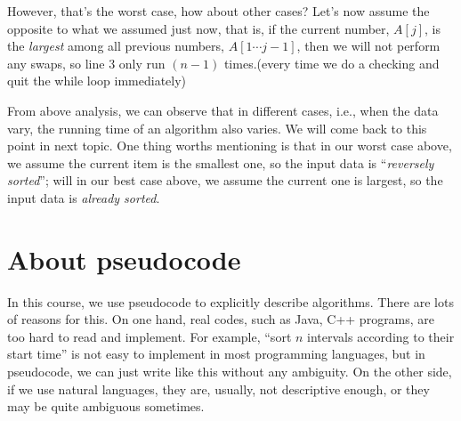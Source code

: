 \begin{spacing}{1.3}
    However, that's the worst case, how about other cases? Let's now assume the opposite 
    to what we assumed just now, that is, if the current number, $A[j]$, 
    is the {\it largest} among all previous numbers, $A[1\cdots j-1]$, then we will not 
    perform any swaps, so line 3 only run $(n-1)$ times.(every time we do a checking 
    and quit the while loop immediately)

    From above analysis, we can observe that in different cases, i.e., when the data vary,
    the running time of an algorithm also varies. We will come back to this point 
    in next topic. One thing worths mentioning is that in our worst case above, 
    we assume the current item is the smallest one, so the input data is 
    ``{\it reversely sorted}''; will in our best case above, we assume the current one is 
    largest, so the input data is {\it already sorted}.
    




    \vspace{0.3in}
    \section{About pseudocode}

    In this course, we use pseudocode to explicitly describe algorithms.
    There are lots of reasons for this. On one hand, real codes, such as 
    Java, C++ programs, are too hard to read and implement. For example,
    ``sort $n$ intervals according to their start time'' is not easy to 
    implement in most programming languages, but in pseudocode, we can 
    just write like this without any ambiguity. On the other side, 
    if we use natural languages, they are, usually, not descriptive enough,
    or they may be quite ambiguous sometimes.


\end{spacing}
